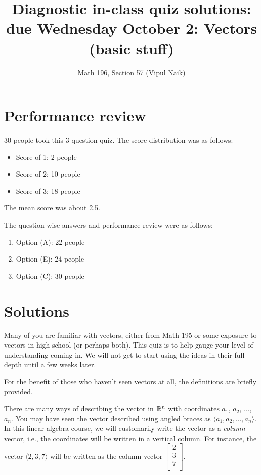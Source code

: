 \documentclass[10pt]{amsart}
\title{Diagnostic in-class quiz solutions: due Wednesday October 2:
  Vectors (basic stuff)} \author{Math 196, Section 57 (Vipul Naik)}
\begin{document}
\maketitle

\section{Performance review}

30 people took this $3$-question quiz. The score distribution was as follows:

\begin{itemize}
\item Score of 1: 2 people
\item Score of 2: 10 people
\item Score of 3: 18 people
\end{itemize}

The mean score was about 2.5.

The question-wise answers and performance review were as follows:

\begin{enumerate}
\item Option (A): 22 people
\item Option (E): 24 people
\item Option (C): 30 people
\end{enumerate}

\section{Solutions}

Many of you are familiar with vectors, either from Math 195 or some
exposure to vectors in high school (or perhaps both).  This quiz is to
help gauge your level of understanding coming in. We will not get to
start using the ideas in their full depth until a few weeks later.

For the benefit of those who haven't seen vectors at all, the
definitions are briefly provided.

There are many ways of describing the vector in $\mathbb{R}^n$ with
coordinates $a_1$, $a_2$, $\dots$, $a_n$. You may have seen the vector
described using angled braces as $\langle a_1,a_2,\dots,a_n
\rangle$. In this linear algebra course, we will customarily write the
vector as a {\em column} vector, i.e., the coordinates will be written
in a vertical column. For instance, the vector $\langle 2,3,7 \rangle$
will be written as the column vector $\left[\begin{matrix} 2 \\ 3 \\ 7
    \\\end{matrix}\right]$.
\end{document}
